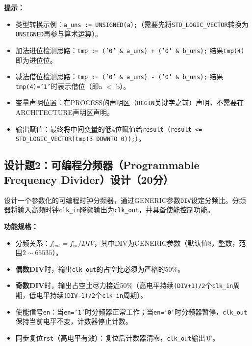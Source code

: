 \begin{framed}
\textbf{提示：}
\begin{itemize}
  \item 类型转换示例：\texttt{a\_uns := UNSIGNED(a);}（需要先将\texttt{STD\_LOGIC\_VECTOR}转换为\texttt{UNSIGNED}再参与算术运算）。
  \item 加法进位检测思路：\texttt{tmp := ('0' \& a\_uns) + ('0' \& b\_uns);} 结果\texttt{tmp(4)}即为进位位。
  \item 减法借位检测思路：\texttt{tmp := ('0' \& a\_uns) - ('0' \& b\_uns);} 结果\texttt{tmp(4)='1'}时表示借位（即a $<$ b）。
  \item 变量声明位置：在PROCESS的声明区（\texttt{BEGIN}关键字之前）声明，不需要在ARCHITECTURE声明区声明。
  \item 输出赋值：最终将中间变量的低4位赋值给\texttt{result}（\texttt{result <= STD\_LOGIC\_VECTOR(tmp(3 DOWNTO 0));}）。
\end{itemize}
\end{framed}

\newpage

\subsection*{设计题2：可编程分频器（Programmable Frequency Divider）设计（20分）}

设计一个参数化的可编程时钟分频器，通过GENERIC参数\texttt{DIV}设定分频比。分频器将输入高频时钟\texttt{clk\_in}降频输出为\texttt{clk\_out}，并具备使能控制功能。

\vspace{0.3cm}

\textbf{功能规格：}
\begin{itemize}
  \item 分频关系：$f_{out} = f_{in} / DIV$，其中DIV为GENERIC参数（默认值8，整数，范围$2\sim 65535$）。
  \item \textbf{偶数DIV}时，输出\texttt{clk\_out}的占空比必须为严格的50\%。
  \item \textbf{奇数DIV}时，输出占空比尽力接近50\%（高电平持续\texttt{(DIV+1)/2}个\texttt{clk\_in}周期，低电平持续\texttt{(DIV-1)/2}个\texttt{clk\_in}周期）。
  \item 使能信号\texttt{en}：当\texttt{en='1'}时分频器正常工作；当\texttt{en='0'}时分频器暂停，\texttt{clk\_out}保持当前电平不变，计数器停止计数。
  \item 同步复位\texttt{rst}（高电平有效）：复位后计数器清零，\texttt{clk\_out}输出'0'。
\end{itemize}

